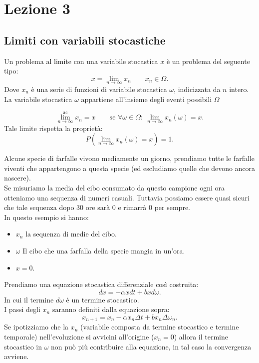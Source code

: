 \section{Lezione 3}%
\label{sub:Lezione 3}
\subsection{Limiti con variabili stocastiche}%
\label{sub:Limiti con variabili stocastiche}
Un problema al limite con una variabile stocastica $x$ è un problema del seguente tipo:
\[
    x = \lim_{n \to \infty} x_n \qquad x_n \in \Omega
.\] 
Dove $x_n$ è una serie di funzioni di variabile stocastica $\omega$, indicizzata da $n$ intero. \\
La variabile stocastica $\omega$ appartiene all'insieme degli eventi possibili $\Omega$
\begin{defn}[\textcolor{red}{Almost Certain Limit}]
 \[
    \lim^{\text{ac}}_{n \to \infty} x_n = x
    \qquad \text{se } \forall \omega \in \Omega: \
    \lim_{n \to \infty} x_n(\omega) = x
.\] 
Tale limite rispetta la proprietà:
\[
    P(\lim_{n \to \infty} x_n(\omega) =x) =1
.\] 
\end{defn}
\begin{exmp}[Farfalle]
    Alcune specie di farfalle vivono mediamente un giorno, prendiamo tutte le farfalle viventi che appartengono a questa specie (ed escludiamo quelle che devono ancora nascere).\\
    Se misuriamo la media del cibo consumato da questo campione ogni ora otteniamo una sequenza di numeri casuali.
    Tuttavia possiamo essere quasi sicuri che tale sequenza dopo 30 ore sarà 0 e rimarrà 0 per sempre.\\
    In questo esempio si hanno: 
    \begin{itemize}
        \item $x_n$ la sequenza di medie del cibo.
	\item $\omega$ Il cibo che una farfalla della specie mangia in un'ora.
	\item $x = 0$.
    \end{itemize} 
\end{exmp}
\begin{exmp}
    Prendiamo una equazione stocastica differenziale così costruita:
    \[
        dx = - \alpha x dt + bxd\omega
    .\] 
    In cui il termine $d\omega$ è un termine stocastico.\\
    I passi degli $x_n$ saranno definiti dalla equazione sopra:
    \[
        x_{n+1} = x_n - \alpha  x_n \Delta t + b x_n \Delta\omega_n
    .\] 
    Se ipotizziamo che la $x_n$ (variabile composta da termine stocastico e termine temporale)  nell'evoluzione si avvicini all'origine ($x_n = 0$) allora il termine stocastico in $\omega$ non può più contribuire alla equazione, in tal caso la convergenza avviene.
\end{exmp}
